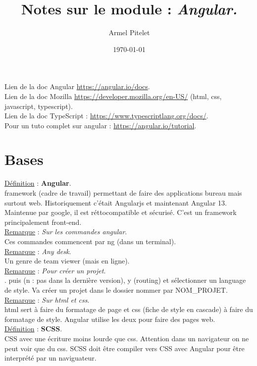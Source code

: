 \documentclass[a4paper,12pt,twoside]{article}
\title{Notes sur le module : \textit{Angular.}}
\author{Armel Pitelet}
\date{\today}
\newcommand{\incode}[1]{{\footnotesize\ttfamily #1}} %
\newcommand{\rem}[2]{\noindent\underline{Remarque} : \textit{#1}.\\ \indent #2}
\newcommand{\defi}[2]{\noindent\underline{Définition} : \textbf{#1}.\\ \indent #2}
\begin{document}
\maketitle
\tableofcontents

Lien de la doc Angular \url{https://angular.io/docs}. \\
Lien de la doc Mozilla \url{https://developer.mozilla.org/en-US/} (html, css, javascript, typescript).\\
Lien de la doc TypeScript : \url{https://www.typescriptlang.org/docs/}.\\
Pour un tuto complet sur angular : \url{https://angular.io/tutorial}.\\

\section{Bases}

\defi{Angular}{framework (cadre de travail) permettant de faire des applications bureau mais surtout web. Historiquement c'était Angularjs et maintenant Angular 13. Maintenue par google, il est réttocompatible et sécurisé. C'est un framework principalement front-end.}\\

\rem{Sur les commandes angular}{Ces commandes commencent par \incode{ng} (dans un terminal).}\\

\rem{Any desk}{Un genre de team viewer (mais en ligne).}\\

\rem{Pour créer un projet}{\incode{ng new NOM\_PROJET}. puis (\incode{n} : pas dans la dernière version), \incode{y} (routing) et sélectionner un language de style. Va créer un projet dans le dossier nommer par NOM\_PROJET.}\\

\rem{Sur html et css}{html sert à faire du formatage de page et css (fiche de style en cascade) à faire du formatage de style. Angular utilise les deux pour faire des pages web.}\\

\defi{SCSS}{CSS avec une écriture moins lourde que css. Attention dans un navigateur on ne peut voir que du css. SCSS doit être compiler vers CSS avec Angular pour être interprété par un naviguateur.}\\
\end{document}
